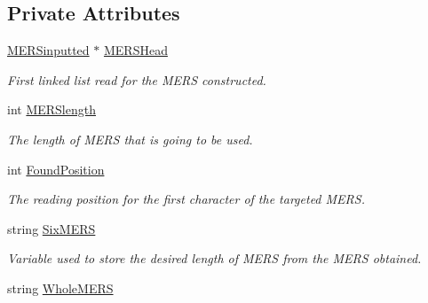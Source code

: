 \subsection*{Private Attributes}
\begin{DoxyCompactItemize}
\item 
\hypertarget{class_calculation_ac72f9615fea1fd73f14545ef42d4dc84}{\hyperlink{struct_m_e_r_sinputted}{M\+E\+R\+Sinputted} $\ast$ \hyperlink{class_calculation_ac72f9615fea1fd73f14545ef42d4dc84}{M\+E\+R\+S\+Head}}\label{class_calculation_ac72f9615fea1fd73f14545ef42d4dc84}

\begin{DoxyCompactList}\small\item\em First linked list read for the M\+E\+R\+S constructed. \end{DoxyCompactList}\item 
\hypertarget{class_calculation_a4ddb41c00a10f531c767a087ad4fc1ad}{int \hyperlink{class_calculation_a4ddb41c00a10f531c767a087ad4fc1ad}{M\+E\+R\+Slength}}\label{class_calculation_a4ddb41c00a10f531c767a087ad4fc1ad}

\begin{DoxyCompactList}\small\item\em The length of M\+E\+R\+S that is going to be used. \end{DoxyCompactList}\item 
\hypertarget{class_calculation_afa0facc958d03212c6aeda6b2e1f06fd}{int \hyperlink{class_calculation_afa0facc958d03212c6aeda6b2e1f06fd}{Found\+Position}}\label{class_calculation_afa0facc958d03212c6aeda6b2e1f06fd}

\begin{DoxyCompactList}\small\item\em The reading position for the first character of the targeted M\+E\+R\+S. \end{DoxyCompactList}\item 
\hypertarget{class_calculation_af0887aa70633f9b5ce6bf585cc9524af}{string \hyperlink{class_calculation_af0887aa70633f9b5ce6bf585cc9524af}{Six\+M\+E\+R\+S}}\label{class_calculation_af0887aa70633f9b5ce6bf585cc9524af}

\begin{DoxyCompactList}\small\item\em Variable used to store the desired length of M\+E\+R\+S from the M\+E\+R\+S obtained. \end{DoxyCompactList}\item 
\hypertarget{class_calculation_a37611e113711795d577189702d6aab4a}{string \hyperlink{class_calculation_a37611e113711795d577189702d6aab4a}{Whole\+M\+E\+R\+S}}\label{class_calculation_a37611e113711795d577189702d6aab4a}


\end{DoxyCompactItemize}
